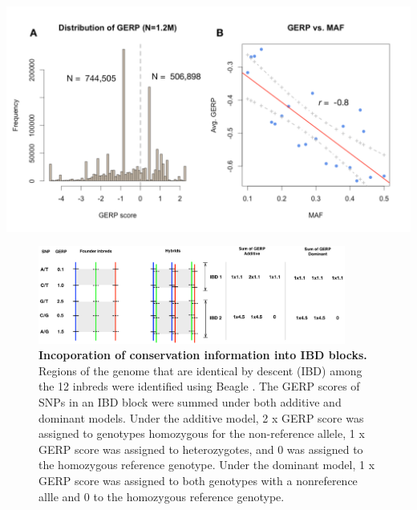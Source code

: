 \documentclass[10pt]{article}
\begin{document}
\begin{center}\vspace{1cm}
\includegraphics[width=0.8\linewidth]{gerp.pdf}
\end{center}\vspace{1cm}





\begin{figure}[here]
\includegraphics[width=0.9\textwidth]{gerpIBD.pdf}
\caption{
\textbf{Incoporation of conservation information into IBD blocks.}
Regions of the genome that are identical by descent (IBD) among the 12 inbreds were identified using Beagle \citep{Browning2009}.  The GERP scores of SNPs in an IBD block were summed under both additive and dominant models. Under the additive model, 2 x GERP score was assigned to genotypes homozygous for the non-reference allele, 1 x GERP score was assigned to heterozygotes, and 0 was assigned to the homozygous reference genotype. Under the dominant model, 1 x GERP score was assigned to both genotypes with a nonreference allle and 0 to the homozygous reference genotype.}
\label{fig:gerpibd}
\end{figure}
\end{document}
